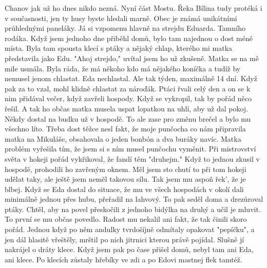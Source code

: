 
Chanov jak už ho dnes nikdo nezná. Nyní část Mostu. Řeka Bílina tudy
protéká i v současnosti, jen ty husy byste hledali marně. Obec je
známá unikátními průhlednými paneláky. Já si vzpomenu hlavně na
strejdu Eduarda. Tamního rodáka. Když jsem jednoho dne přiběhl domů,
bylo tam najednou o dost méně místa. Byla tam spousta klecí s ptáky a
nějaký chlap, kterého mi matka představila jako Edu. "Ahoj strejdo,"
uvítal jsem ho už zkušeně. Matka se na mě mile usmála. Byla ráda, že
má někoho kdo má nějakého koníčka a tudíž by nemusel jenom chlastat.
Eda nechlastal. Ale tak týden, maximálně 14 dní. Když pak za to vzal,
mohl klidně chlastat za nároďák. Ptáci řvali celý den a on se k nim
přidával večer, když zavřeli hospody. Když se vykropil, tak by pořád
něco řešil. A tak ho občas matka musela uspat lopatkou na uhlí, aby už
dal pokoj. Někdy dostal na budku už v hospodě. To ale zase pro změnu
brečel a bylo mu všechno líto. Třeba dost těžce nesl fakt, že moje
punčocha co nám připravila matka na Mikuláše, obsahovala o jeden
bonbón a dva buráky navíc. Matka problém vyřešila tím, že jsem si s
ním musel punčochu vyměnit. Při mistrovství světa v hokeji pořád
vykřikoval, že fandí těm "druhejm." Když to jednou zkusil v hospodě,
prohodili ho zavřeným oknem. Měl jsem sto chutí to při tom hokeji
udělat taky, ale ještě jsem neměl takovou sílu. Tak jsem mu aspoň
řek', že je blbej. Když se Eda dostal do situace, že mu ve všech
hospodách v okolí dali minimálně jednou přes hubu, přeřadil na
lahvový. To pak seděl doma a drezůroval ptáky. Chtěl, aby na povel
přeskočili z jednoho bidýlka na druhý a učil je mluvit. To první se mu
občas povedlo. Radost mu nekalil ani fakt, že tak činili skoro pořád.
Jednou když po něm andulky tvrdošíjně odmítaly opakovat "pepíčku", a
jen dál hlasitě vřeštěly, mrštil po nich jitrnici kterou právě
pojídal. Slušně jí nakrájel o dráty klece. Když jsem pak po čase
přišel domů, nebyl tam ani Eda, ani klece. Po klecích zůstaly hřebíky
ve zdi a po Edovi mastnej flek tamtéž.

